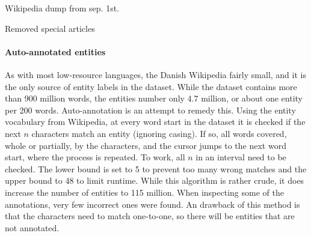 \documentclass[10pt, a4paper]{article}
\begin{document}
Wikipedia dump from sep. 1st.

Removed special articles

\paragraph{Auto-annotated entities}
As with most low-resource languages, the Danish Wikipedia fairly small, and it is the only source of entity labels in the dataset.
While the dataset contains more than 900 million words, the entities number only 4.7 million, or about one entity per 200 words.
Auto-annotation is an attempt to remedy this.
Using the entity vocabulary from Wikipedia, at every word start in the dataset it is checked if the next $ n $ characters match an entity (ignoring casing).
If so, all words covered, whole or partially, by the characters, and the cursor jumps to the next word start, where the process is repeated.
To work, all $ n $ in an interval need to be checked.
The lower bound is set to 5 to prevent too many wrong matches and the upper bound to 48 to limit runtime.
While this algorithm is rather crude, it does increase the number of entities to 115 million.
When inspecting some of the annotations, very few incorrect ones were found.
An drawback of this method is that the characters need to match one-to-one, so there will be entities that are not annotated.
\end{document}
